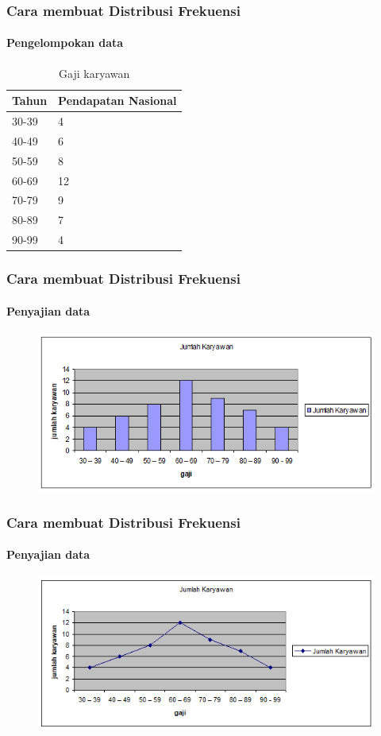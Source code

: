 \documentclass[main.tex]{subfiles}
\begin{document}
\begin{frame}[c]
	\frametitle{Cara membuat Distribusi Frekuensi}
	\framesubtitle{Pengelompokan data}
	\begin{table}[htb]
		\caption{Gaji karyawan}
		\begin{tabular}{ll}
			\hline
			Tahun  &  Pendapatan Nasional  \\
			\hline
			30-39  &  4  \\
			40-49  &  6  \\
			50-59  &  8  \\
			60-69  &  12  \\
			70-79  &  9  \\
			80-89  &  7  \\
			90-99  &  4  \\
			\hline
		\end{tabular}
	\end{table}
\end{frame}


\begin{frame}[c]
	\frametitle{Cara membuat Distribusi Frekuensi}
	\framesubtitle{Penyajian data}
	\begin{figure}
		\begin{center}
			\includegraphics[scale=0.6]{figures/graph1}
		\end{center}
	\end{figure}
\end{frame}

\begin{frame}[c]
	\frametitle{Cara membuat Distribusi Frekuensi}
	\framesubtitle{Penyajian data}
	\begin{figure}
		\begin{center}
			\includegraphics[scale=0.6]{figures/graph2}
		\end{center}
	\end{figure}
\end{frame}
\end{document}
